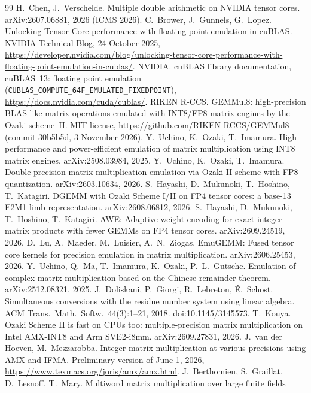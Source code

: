 \documentclass[11pt]{article}
\begin{document}
\begin{thebibliography}{99}
 H.~Chen, J.~Verschelde. Multiple double arithmetic on NVIDIA tensor cores. arXiv:2607.06881, 2026 (ICMS 2026).
 C.~Brower, J.~Gunnels, G.~Lopez. Unlocking Tensor Core performance with floating point emulation in cuBLAS.
NVIDIA Technical Blog, 24 October 2025, \url{https://developer.nvidia.com/blog/unlocking-tensor-core-performance-with-floating-point-emulation-in-cublas/}.
 NVIDIA. cuBLAS library documentation, cuBLAS~13: floating point emulation
(\texttt{CUBLAS\_COMPUTE\_64F\_EMULATED\_FIXEDPOINT}), \url{https://docs.nvidia.com/cuda/cublas/}.
 RIKEN R-CCS. GEMMul8: high-precision BLAS-like matrix operations emulated with INT8/FP8 matrix engines by
the Ozaki scheme~II. MIT license, \url{https://github.com/RIKEN-RCCS/GEMMul8} (commit 30b5b5d, 3 November 2026).
 Y.~Uchino, K.~Ozaki, T.~Imamura. High-performance and power-efficient emulation of matrix
multiplication using INT8 matrix engines. arXiv:2508.03984, 2025.
 Y.~Uchino, K.~Ozaki, T.~Imamura. Double-precision matrix multiplication emulation via Ozaki-II scheme with
FP8 quantization. arXiv:2603.10634, 2026.
 S.~Hayashi, D.~Mukunoki, T.~Hoshino, T.~Katagiri. DGEMM with Ozaki Scheme I/II on FP4 tensor cores: a
base-13 E2M1 limb representation. arXiv:2608.06812, 2026.
 S.~Hayashi, D.~Mukunoki, T.~Hoshino, T.~Katagiri. AWE: Adaptive weight encoding for exact integer matrix
products with fewer GEMMs on FP4 tensor cores. arXiv:2609.24519, 2026.
 D.~Lu, A.~Maeder, M.~Luisier, A.~N.~Ziogas. EmuGEMM: Fused tensor core kernels for precision emulation
in matrix multiplication. arXiv:2606.25453, 2026.
 Y.~Uchino, Q.~Ma, T.~Imamura, K.~Ozaki, P.~L.~Gutsche. Emulation of complex matrix multiplication based on
the Chinese remainder theorem. arXiv:2512.08321, 2025.
 J.~Doliskani, P.~Giorgi, R.~Lebreton, \'E.~Schost. Simultaneous conversions with the residue number system
using linear algebra. ACM Trans.\ Math.\ Softw.\ 44(3):1--21, 2018. doi:10.1145/3145573.
 T.~Kouya. Ozaki Scheme II is fast on CPUs too: multiple-precision matrix multiplication on Intel AMX-INT8
and Arm SVE2-i8mm. arXiv:2609.27831, 2026.
 J.~van der Hoeven, M.~Mezzarobba. Integer matrix multiplication at various precisions using AMX and IFMA.
Preliminary version of June 1, 2026, \url{https://www.texmacs.org/joris/amx/amx.html}.
 J.~Berthomieu, S.~Graillat, D.~Lesnoff, T.~Mary. Multiword matrix multiplication over large finite fields

\end{thebibliography}
\end{document}
